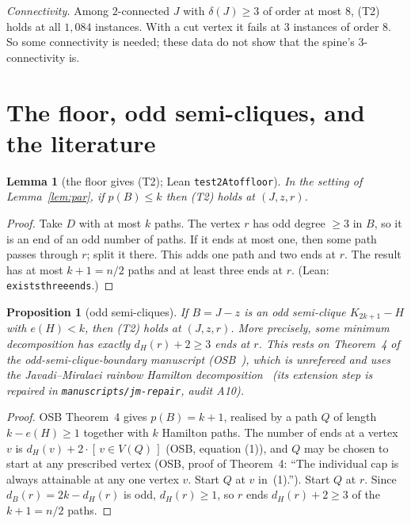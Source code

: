\documentclass[11pt]{amsart}
\newtheorem{lemma}[theorem]{Lemma}
\newtheorem{proposition}[theorem]{Proposition}
\theoremstyle{definition}
\theoremstyle{remark}
\renewcommand{\_}{\oldunderscore\allowbreak}
\newcommand{\ind}[1]{[\,#1\,]}
\begin{document}
\emph{Connectivity.} Among $2$-connected $J$ with $\delta(J)\ge3$ of order at most $8$, (T2) holds
at all $1{,}084$ instances. With a cut vertex it fails at $3$ instances of order $8$. So some connectivity is needed;
these data do not show that the spine's $3$-connectivity is.

\section{The floor, odd semi-cliques, and the literature}\label{sec:floor}

\begin{lemma}[the floor gives (T2); Lean \texttt{test2At\_of\_floor}]\label{lem:floor}
In the setting of Lemma~\ref{lem:par}, if $p(B)\le k$ then (T2) holds at $(J,z,r)$.
\end{lemma}

\begin{proof}
Take $D$ with at most $k$ paths. The vertex $r$ has odd degree $\ge3$ in $B$, so it is an end of an
odd number of paths. If it ends at most one, then some path passes through $r$; split it there.
This adds one path and two ends at $r$. The result has at most $k+1=n/2$ paths and at least three
ends at $r$. (Lean: \texttt{exists\_three\_ends}.)
\end{proof}

\begin{proposition}[odd semi-cliques]\label{prop:semi}
If $B=J-z$ is an odd semi-clique $K_{2k+1}-H$ with $e(H)<k$, then (T2) holds at $(J,z,r)$. More
precisely, some minimum decomposition has exactly $d_H(r)+2\ge3$ ends at $r$. This rests on
Theorem~4 of the odd-semi-clique-boundary manuscript (OSB~\cite{OSB}), which is unrefereed and
uses the Javadi--Miralaei rainbow Hamilton decomposition~\cite{JM} (its extension step is repaired
in \texttt{manuscripts/jm-repair}, audit A10).
\end{proposition}

\begin{proof}
OSB Theorem~4 gives $p(B)=k+1$, realised by a path $Q$ of length $k-e(H)\ge1$ together with $k$
Hamilton paths. The number of ends at a vertex $v$ is $d_H(v)+2\cdot\ind{v\in V(Q)}$ (OSB, equation
(1)), and $Q$ may be chosen to start at any prescribed vertex (OSB, proof of Theorem~4: ``The
individual cap is always attainable at any one vertex $v$. Start $Q$ at $v$ in~(1).'').
Start $Q$ at $r$. Since $d_B(r)=2k-d_H(r)$ is odd, $d_H(r)\ge1$, so $r$ ends $d_H(r)+2\ge3$ of the
$k+1=n/2$ paths.
\end{proof}
\end{document}
